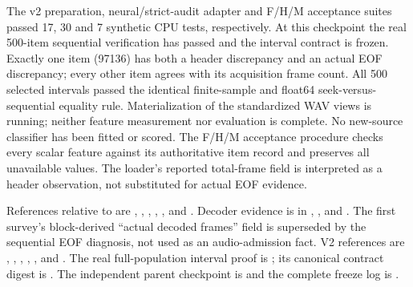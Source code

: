 The v2 preparation, neural/strict-audit adapter and F/H/M acceptance suites
passed 17, 30 and 7 synthetic CPU tests, respectively. At this checkpoint the
real 500-item sequential verification has passed and the interval contract is
frozen. Exactly one item (97136) has both a header discrepancy and an actual
EOF discrepancy; every other item agrees with its acquisition frame count.
All 500 selected intervals passed the identical finite-sample and float64
seek-versus-sequential equality rule. Materialization of the standardized WAV
views is running; neither feature measurement nor evaluation is complete.
No new-source classifier has been fitted or
scored. The F/H/M acceptance procedure checks every scalar feature against
its authoritative item record and preserves all unavailable values. The
loader's reported total-frame field is interpreted as a header observation,
not substituted for actual EOF evidence.

References relative to 
are ,
,
,
,
, and
.
Decoder evidence is in ,
, and
. The first survey's
block-derived ``actual decoded frames'' field is superseded by the sequential
EOF diagnosis, not used as an audio-admission fact.
V2 references are ,
,
,
,
, and
. The real full-population interval proof is
; its canonical
contract digest is
.
The independent parent checkpoint is
 and the complete
freeze log is .

